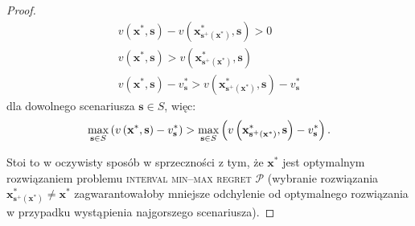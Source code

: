 \begin{proof}
	\begin{gather*}
	v \left( \textbf{x}^{\ast}, \textbf{s} \right) - v \left( \textbf{x}^{\ast}_{\textbf{s}^{+} \left( \textbf{x}^{\ast} \right)}, \textbf{s} \right) > 0 \\
	v \left( \textbf{x}^{\ast}, \textbf{s} \right) > v \left( \textbf{x}^{\ast}_{\textbf{s}^{+} \left( \textbf{x}^{\ast} \right)}, \textbf{s} \right) \\
	v \left( \textbf{x}^{\ast}, \textbf{s} \right) - v^{\ast}_{\textbf{s}} > v \left( \textbf{x}^{\ast}_{\textbf{s}^{+} \left( \textbf{x}^{\ast} \right)}, \textbf{s} \right) - v^{\ast}_{\textbf{s}}
	\end{gather*}
	dla dowolnego scenariusza $\textbf{s} \in S$, więc:
	\begin{equation*}
			\max_{\mathclap{\textbf{s} \in S}} \left( v \left( \textbf{x}^{\ast}, \textbf{s} \right) - v^{\ast}_{\textbf{s}} \right) > \max_{\mathclap{\textbf{s} \in S}} \left( v \left( \textbf{x}^{\ast}_{\textbf{s}^{+} \left( \textbf{x}^{\ast} \right)}, \textbf{s} \right) - v^{\ast}_{\textbf{s}} \right)\text{.}
	\end{equation*}
	
	Stoi to w oczywisty sposób w sprzeczności z tym, że $\textbf{x}^{\ast}$ jest optymalnym rozwiązaniem problemu \textsc{interval min--max regret $\mathcal{P}$} (wybranie rozwiązania $\textbf{x}^{\ast}_{\textbf{s}^{+} \left( \textbf{x}^{\ast} \right)} \neq \textbf{x}^{\ast}$ zagwarantowałoby mniejsze odchylenie od optymalnego rozwiązania w przypadku wystąpienia najgorszego scenariusza).
\end{proof}

